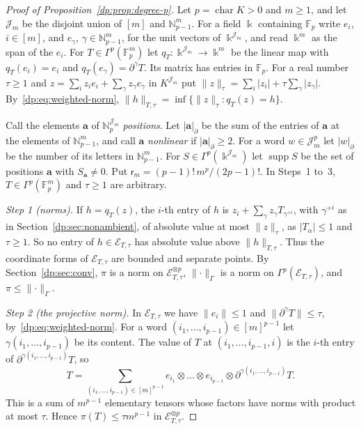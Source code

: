 \documentclass[11pt]{amsart}
\theoremstyle{definition}
\theoremstyle{remark}
\numberwithin{equation}{section}
\newcommand{\N}{\mathbb N}
\newcommand{\F}{\mathbb F}
\newcommand{\abs}[1]{\lvert #1\rvert}
\newcommand{\norm}[1]{\lVert #1\rVert}
\theoremstyle{plain}
\theoremstyle{definition}
\theoremstyle{plain}
\begin{document}
\begin{proof}[Proof of Proposition~\ref{dp:prop:degree-p}]
Let $p=\operatorname{char}K>0$ and $m\ge1$, and let $\mathcal J_m$ be the disjoint union of $[m]$ and $\N^m_{p-1}$. For a field $\Bbbk$ containing $\F_p$ write $e_i$, $i\in[m]$, and $e_\gamma$, $\gamma\in\N^m_{p-1}$, for the unit vectors of $\Bbbk^{\mathcal J_m}$, and read $\Bbbk^m$ as the span of the $e_i$. For $T\in\Gamma^p(\F_p^m)$ let $q_T\colon\Bbbk^{\mathcal J_m}\to\Bbbk^m$ be the linear map with $q_T(e_i)=e_i$ and $q_T(e_\gamma)=\partial^\gamma T$. Its matrix has entries in $\F_p$. For a real number $\tau\ge1$ and $z=\sum_iz_ie_i+\sum_\gamma z_\gamma e_\gamma$ in $K^{\mathcal J_m}$ put $\norm z_\tau=\sum_i\abs{z_i}+\tau\sum_\gamma\abs{z_\gamma}$. By~\eqref{dp:eq:weighted-norm}, $\norm h_{T,\tau}=\inf\{\norm z_\tau:q_T(z)=h\}$.

Call the elements $\mathbf a$ of $\N^{\mathcal J_m}_p$ \emph{positions}. Let $\abs{\mathbf a}_\partial$ be the sum of the entries of $\mathbf a$ at the elements of $\N^m_{p-1}$, and call $\mathbf a$ \emph{nonlinear} if $\abs{\mathbf a}_\partial\ge2$. For a word $w\in\mathcal J_m^p$ let $\abs w_\partial$ be the number of its letters in $\N^m_{p-1}$. For $S\in\Gamma^p(\Bbbk^{\mathcal J_m})$ let $\operatorname{supp}S$ be the set of positions $\mathbf a$ with $S_{\mathbf a}\ne0$. Put $\mathsf r_m=(p-1)!\,m^p/(2p-1)!$. In Steps~1 to~3, $T\in\Gamma^p(\F_p^m)$ and $\tau\ge1$ are arbitrary.

\emph{Step 1 (norms).} If $h=q_T(z)$, the $i$-th entry of $h$ is $z_i+\sum_\gamma z_\gamma T_{\gamma^{+i}}$, with $\gamma^{+i}$ as in Section~\ref{dp:sec:nonambient}, of absolute value at most $\norm z_\tau$, as $\abs{T_\alpha}\le1$ and $\tau\ge1$. So no entry of $h\in\mathcal E_{T,\tau}$ has absolute value above $\norm h_{T,\tau}$. Thus the coordinate forms of $\mathcal E_{T,\tau}$ are bounded and separate points. By Section~\ref{dp:sec:conv}, $\pi$ is a norm on $\mathcal E_{T,\tau}^{\otimes p}$, $\norm\cdot_\Gamma$ is a norm on $\Gamma^p(\mathcal E_{T,\tau})$, and $\pi\le\norm\cdot_\Gamma$.

\emph{Step 2 (the projective norm).} In $\mathcal E_{T,\tau}$ we have $\norm{e_i}\le1$ and $\norm{\partial^\gamma T}\le\tau$, by~\eqref{dp:eq:weighted-norm}. For a word $(i_1,\dots,i_{p-1})\in[m]^{p-1}$ let $\gamma(i_1,\dots,i_{p-1})$ be its content. The value of $T$ at $(i_1,\dots,i_{p-1},i)$ is the $i$-th entry of $\partial^{\gamma(i_1,\dots,i_{p-1})}T$, so
\[
 T=\sum_{(i_1,\dots,i_{p-1})\in[m]^{p-1}}e_{i_1}\otimes\dots\otimes e_{i_{p-1}}\otimes\partial^{\gamma(i_1,\dots,i_{p-1})}T.
\]
This is a sum of $m^{p-1}$ elementary tensors whose factors have norms with product at most $\tau$. Hence $\pi(T)\le\tau m^{p-1}$ in $\mathcal E_{T,\tau}^{\otimes p}$.


\end{proof}
\end{document}
